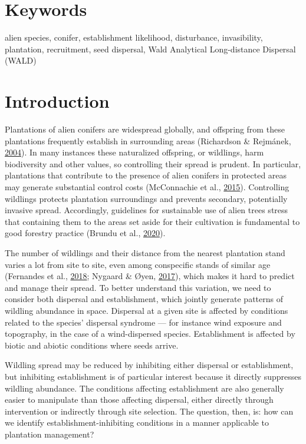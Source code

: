 \documentclass[
]{article}
\begin{document}
\hypertarget{keywords}{%
\section{Keywords}\label{keywords}}

alien species, conifer, establishment likelihood, disturbance, invasibility, plantation, recruitment, seed dispersal, Wald Analytical Long-distance Dispersal (WALD)

\hypertarget{introduction}{%
\section{Introduction}\label{introduction}}

Plantations of alien conifers are widespread globally, and offspring from these plantations frequently establish in surrounding areas (Richardson \& Rejmánek, \protect\hyperlink{ref-richardsonConifersInvasiveAliens2004}{2004}).
In many instances these naturalized offspring, or wildlings, harm biodiversity and other values, so controlling their spread is prudent.
In particular, plantations that contribute to the presence of alien conifers in protected areas may generate substantial control costs (McConnachie et al., \protect\hyperlink{ref-mcconnachieEstimatingEffectPlantations2015}{2015}).
Controlling wildlings protects plantation surroundings and prevents secondary, potentially invasive spread.
Accordingly, guidelines for sustainable use of alien trees stress that containing them to the areas set aside for their cultivation is fundamental to good forestry practice (Brundu et al., \protect\hyperlink{ref-brunduGlobalGuidelinesSustainable2020}{2020}).

The number of wildlings and their distance from the nearest plantation stand varies a lot from site to site, even among conspecific stands of similar age (Fernandes et al., \protect\hyperlink{ref-fernandesWhatDrivesEucalyptus2018}{2018}; Nygaard \& Øyen, \protect\hyperlink{ref-nygaardSpreadIntroducedSitka2017}{2017}), which makes it hard to predict and manage their spread.
To better understand this variation, we need to consider both dispersal and establishment, which jointly generate patterns of wildling abundance in space.
Dispersal at a given site is affected by conditions related to the species' dispersal syndrome --- for instance wind exposure and topography, in the case of a wind-dispersed species.
Establishment is affected by biotic and abiotic conditions where seeds arrive.

Wildling spread may be reduced by inhibiting either dispersal or establishment, but inhibiting establishment is of particular interest because it directly suppresses wildling abundance.
The conditions affecting establishment are also generally easier to manipulate than those affecting dispersal, either directly through intervention or indirectly through site selection.
The question, then, is: how can we identify establishment-inhibiting conditions in a manner applicable to plantation management?
\end{document}
